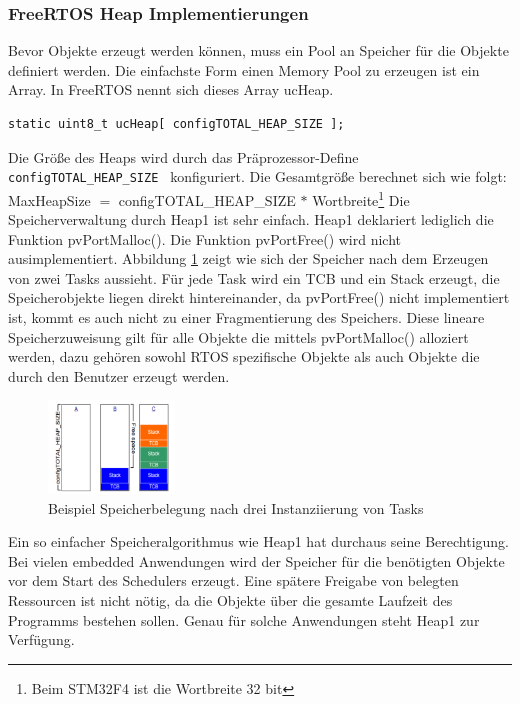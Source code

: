 \subsubsection{FreeRTOS Heap Implementierungen}
Bevor Objekte erzeugt werden können, muss ein Pool an Speicher für die Objekte definiert werden. Die einfachste Form einen Memory Pool zu erzeugen ist ein Array. In FreeRTOS nennt sich dieses Array ucHeap. 
\begin{lstlisting}[label=lst:ucHeap, float=hbt, numbers = none]
static uint8_t ucHeap[ configTOTAL_HEAP_SIZE ];
\end{lstlisting}
\newline
Die Größe des Heaps wird durch das Präprozessor-Define \verb|configTOTAL_HEAP_SIZE | konfiguriert. Die Gesamtgröße berechnet sich wie folgt:
\newline
\newline
MaxHeapSize $=$ configTOTAL\_HEAP\_SIZE $\ast$ Wortbreite\footnote{Beim STM32F4 ist die Wortbreite 32 bit} 
\newline
\newline
Die Speicherverwaltung durch Heap1 ist sehr einfach. Heap1 deklariert lediglich die Funktion pvPortMalloc(). Die Funktion pvPortFree() wird nicht ausimplementiert. Abbildung \ref{fig:Heap1} zeigt wie sich der Speicher nach dem Erzeugen von zwei Tasks aussieht. Für jede Task wird ein TCB und ein Stack erzeugt, die Speicherobjekte liegen direkt hintereinander, da pvPortFree() nicht implementiert ist, kommt es auch nicht zu einer Fragmentierung des Speichers. Diese lineare Speicherzuweisung gilt für alle Objekte die mittels pvPortMalloc() alloziert werden, dazu gehören sowohl RTOS spezifische Objekte als auch Objekte die durch den Benutzer erzeugt werden. 
\begin{figure}[ht!]
	\centering
		\includegraphics[width=0.3\textwidth]{Pictures/FreeRTOSOrg/heap1Alg.png}
	\caption{Beispiel Speicherbelegung nach drei Instanziierung von Tasks}
	\label{fig:Heap1}
\end{figure}
Ein so einfacher Speicheralgorithmus wie Heap1 hat durchaus seine Berechtigung. Bei vielen embedded Anwendungen wird der Speicher für die benötigten Objekte vor dem Start des Schedulers erzeugt. Eine spätere Freigabe von belegten Ressourcen ist nicht nötig, da die Objekte über die gesamte Laufzeit des Programms bestehen sollen. Genau für solche Anwendungen steht Heap1 zur Verfügung. 
